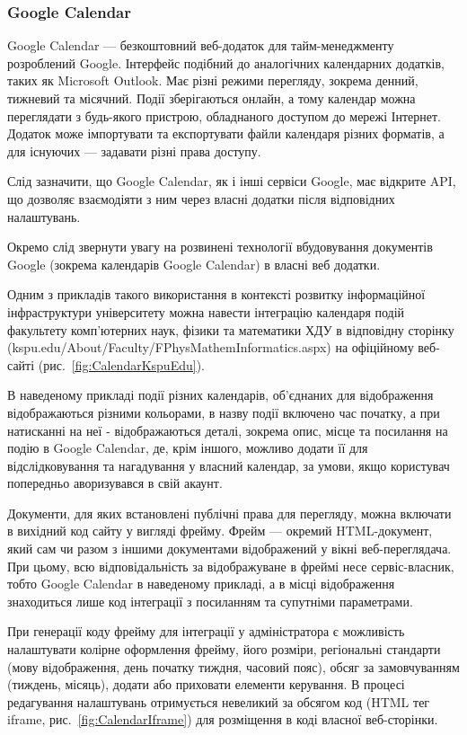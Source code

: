 \subsubsection{Google Calendar}

Google Calendar — безкоштовний веб-додаток для тайм-менеджменту розроблений Google. Інтерфейс подібний до аналогічних календарних додатків, таких як Microsoft Outlook. Має різні режими перегляду, зокрема денний, тижневий та місячний. Події зберігаються онлайн, а тому календар можна переглядати з будь-якого пристрою, обладнаного доступом до мережі Інтернет. Додаток може імпортувати та експортувати файли календаря різних форматів, а для існуючих — задавати різні права доступу. 

Слід зазначити, що Google Calendar, як і інші сервіси Google, має відкрите API, що дозволяє взаємодіяти з ним через власні додатки після відповідних налаштувань.

Окремо слід звернути увагу на розвинені технології вбудовування документів Google (зокрема календарів Google Calendar) в власні веб додатки. 

Одним з прикладів такого використання в контексті розвитку інформаційної інфраструктури університету можна навести інтеграцію календаря подій факультету комп'ютерних наук, фізики та математики ХДУ в відповідну сторінку (kspu.edu/About/Faculty/FPhysMathemInformatics.aspx) на офіційному веб-сайті (рис.~\ref{fig:CalendarKspuEdu}).


В наведеному прикладі події різних календарів, об'єднаних для відображення відображаються різними кольорами, в назву події включено час початку, а при натисканні на неї - відображаються деталі, зокрема опис, місце та посилання на подію в Google Calendar, де, крім іншого, можливо додати її для відслідковування та нагадування у власний календар, за умови, якщо користувач попередньо аворизувався в свій акаунт.

Документи, для яких встановлені публічні права для перегляду, можна включати в вихідний код сайту у вигляді фрейму. Фрейм — окремий HTML-документ, який сам чи разом з іншими документами відображений у вікні веб-переглядача. При цьому, всю відповідальність за відображуване в фреймі несе сервіс-власник, тобто Google Calendar в наведеному прикладі, а в місці відображення знаходиться лише код інтеграції з посиланням та супутніми параметрами.

При генерації коду фрейму для інтеграції у адміністратора є можливість налаштувати колірне оформлення фрейму, його розміри, регіональні стандарти (мову відображення, день початку тиждня, часовий пояс), обсяг за замовчуванням (тиждень, місяць), додати або приховати елементи керування. В процесі редагування налаштувань отримується невеликий за обсягом код (HTML тег iframe, рис.~\ref{fig:CalendarIframe}) для розміщення в коді власної веб-сторінки. 

